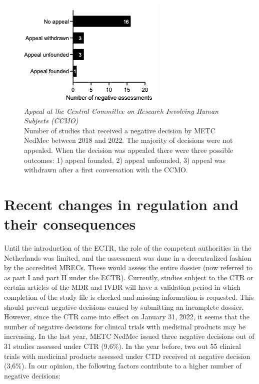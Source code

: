 \documentclass[authordate, meta]{jote-new-article}
\begin{document}
\begin{figure}
  \begin{fullwidth}

    \includegraphics[width=\linewidth]{media/Picture4.png}

    \caption{\emph{Appeal at the Central Committee on Research Involving Human Subjects (CCMO)}\\
      Number of studies that received a negative decision by METC NedMec between 2018 and 2022. The majority of decisions were not appealed. When the decision was appealed there were three possible outcomes: 1) appeal founded, 2) appeal unfounded, 3) appeal was withdrawn after a first conversation with the CCMO.}

    \label{fig:rId14}
  \end{fullwidth}
\end{figure}







\section{Recent changes in regulation and their consequences}



Until the introduction of the ECTR, the role of the competent authorities in the Netherlands was limited, and the assessment was done in a decentralized fashion by the accredited MRECs. These would assess the entire dossier (now referred to as part I and part II under the ECTR). Currently, studies subject to the CTR or certain articles of the MDR and IVDR will have a validation period in which completion of the study file is checked and missing information is requested. This should prevent negative decisions caused by submitting an incomplete dossier. However, since the CTR came into effect on January 31, 2022, it seems that the number of negative decisions for clinical trials with medicinal products may be increasing. In the last year, METC NedMec issued three negative decisions out of 31 studies assessed under CTR (9,6\%). In the year before, two out 55 clinical trials with medicinal products assessed under CTD received at negative decision (3,6\%). In our opinion, the following factors contribute to a higher number of negative decisions:
\end{document}
